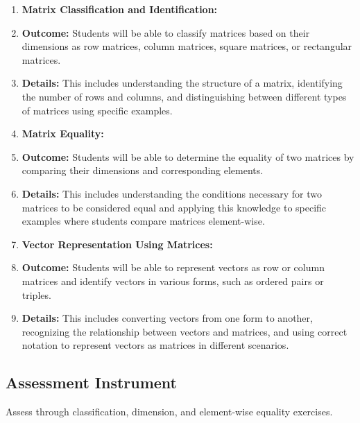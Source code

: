 \begin{enumerate}
    \item \textbf{Matrix Classification and Identification:}
    \item \textbf{Outcome:} Students will be able to classify matrices based on their dimensions as row matrices, column matrices, square matrices, or rectangular matrices.
    \item \textbf{Details:} This includes understanding the structure of a matrix, identifying the number of rows and columns, and distinguishing between different types of matrices using specific examples.
    \item \textbf{Matrix Equality:}
    \item \textbf{Outcome:} Students will be able to determine the equality of two matrices by comparing their dimensions and corresponding elements.
    \item \textbf{Details:} This includes understanding the conditions necessary for two matrices to be considered equal and applying this knowledge to specific examples where students compare matrices element-wise.
    \item \textbf{Vector Representation Using Matrices:}
    \item \textbf{Outcome:} Students will be able to represent vectors as row or column matrices and identify vectors in various forms, such as ordered pairs or triples.
    \item \textbf{Details:} This includes converting vectors from one form to another, recognizing the relationship between vectors and matrices, and using correct notation to represent vectors as matrices in different scenarios.
\end{enumerate}


\subsection{Assessment Instrument}
\label{ssec:asse-3669}


Assess through classification, dimension, and element-wise equality
exercises.

